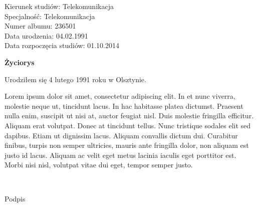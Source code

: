 	\newpage
	\thispagestyle{empty}

\begin{flushright}

  \begin{varwidth}[t]{\textwidth}
	Kierunek studiów: Telekomunikacja\\
	Specjalność: Telekomunikacja \\
	Numer albumu: 236501\\
	Data urodzenia: 04.02.1991 \\
	Data rozpoczęcia studiów: 01.10.2014 \\
  \end{varwidth}

\end{flushright}

\begin{center}
    \textbf{\textbf{Życiorys}}
\end{center}

	\vspace{0.5cm}

Urodziłem się 4 lutego 1991 roku w Olsztynie.

Lorem ipsum dolor sit amet, consectetur adipiscing elit. In et nunc viverra, molestie neque ut, tincidunt lacus. In hac habitasse platea dictumst. Praesent nulla enim, suscipit ut nisi at, auctor feugiat nisl. Duis molestie fringilla efficitur. Aliquam erat volutpat. Donec at tincidunt tellus. Nunc tristique sodales elit sed dapibus. Etiam ut dignissim lacus. Aliquam convallis dictum dui. Curabitur finibus, turpis non semper ultricies, mauris ante fringilla dolor, non aliquam est justo id lacus. Aliquam ac velit eget metus lacinia iaculis eget porttitor est. Morbi nisi nisl, volutpat vitae dui eget, tempor semper justo.

	\vspace{1cm}

\begin{flushright}
	\begin{minipage}{5cm}
		\dotfill \\[-0.7cm]
		\begin{center}
		\small Podpis
		\end{center}
	\end{minipage}
\end{flushright}

	\vspace{2cm}
